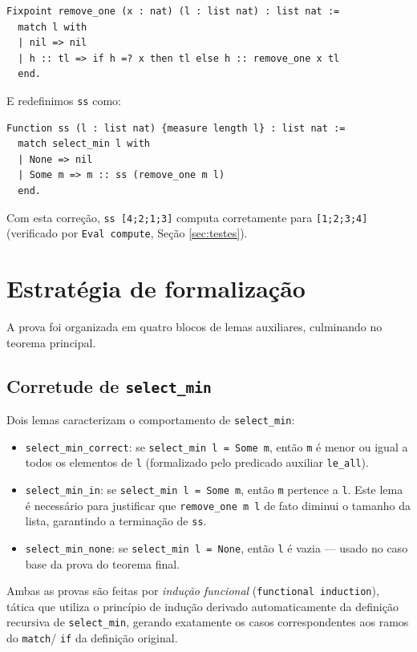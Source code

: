 \documentclass{article}
\begin{document}
\begin{verbatim}
Fixpoint remove_one (x : nat) (l : list nat) : list nat :=
  match l with
  | nil => nil
  | h :: tl => if h =? x then tl else h :: remove_one x tl
  end.
\end{verbatim}

E redefinimos \texttt{ss} como:

\begin{verbatim}
Function ss (l : list nat) {measure length l} : list nat :=
  match select_min l with
  | None => nil
  | Some m => m :: ss (remove_one m l)
  end.
\end{verbatim}

Com esta correção, \texttt{ss [4;2;1;3]} computa corretamente para
\texttt{[1;2;3;4]} (verificado por \texttt{Eval compute}, Seção
\ref{sec:testes}).

\section{Estratégia de formalização}

A prova foi organizada em quatro blocos de lemas auxiliares, culminando no
teorema principal.

\subsection{Corretude de \texttt{select\_min}}

Dois lemas caracterizam o comportamento de \texttt{select\_min}:

\begin{itemize}
  \item \texttt{select\_min\_correct}: se \texttt{select\_min l = Some m},
        então \texttt{m} é menor ou igual a todos os elementos de \texttt{l}
        (formalizado pelo predicado auxiliar \texttt{le\_all}).
  \item \texttt{select\_min\_in}: se \texttt{select\_min l = Some m}, então
        \texttt{m} pertence a \texttt{l}. Este lema é necessário para
        justificar que \texttt{remove\_one m l} de fato diminui o tamanho da
        lista, garantindo a terminação de \texttt{ss}.
  \item \texttt{select\_min\_none}: se \texttt{select\_min l = None}, então
        \texttt{l} é vazia — usado no caso base da prova do teorema final.
\end{itemize}

Ambas as provas são feitas por \emph{indução funcional}
(\texttt{functional induction}), tática que utiliza o princípio de indução
derivado automaticamente da definição recursiva de \texttt{select\_min},
gerando exatamente os casos correspondentes aos ramos do \texttt{match}/
\texttt{if} da definição original.
\end{document}
